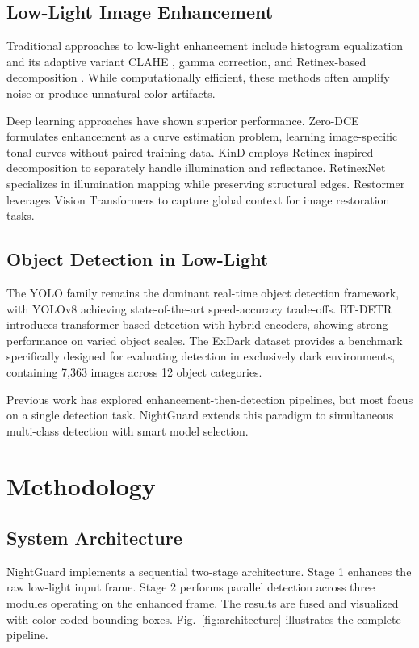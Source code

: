 \documentclass[conference]{IEEEtran}
\begin{document}
\subsection{Low-Light Image Enhancement}

Traditional approaches to low-light enhancement include histogram equalization and its adaptive variant CLAHE \cite{b6}, gamma correction, and Retinex-based decomposition \cite{b7}. While computationally efficient, these methods often amplify noise or produce unnatural color artifacts.

Deep learning approaches have shown superior performance. Zero-DCE \cite{b8} formulates enhancement as a curve estimation problem, learning image-specific tonal curves without paired training data. KinD \cite{b9} employs Retinex-inspired decomposition to separately handle illumination and reflectance. RetinexNet \cite{b10} specializes in illumination mapping while preserving structural edges. Restormer \cite{b11} leverages Vision Transformers to capture global context for image restoration tasks.

\subsection{Object Detection in Low-Light}

The YOLO family \cite{b2} remains the dominant real-time object detection framework, with YOLOv8 achieving state-of-the-art speed-accuracy trade-offs. RT-DETR \cite{b3} introduces transformer-based detection with hybrid encoders, showing strong performance on varied object scales. The ExDark dataset \cite{b5} provides a benchmark specifically designed for evaluating detection in exclusively dark environments, containing 7,363 images across 12 object categories.

Previous work has explored enhancement-then-detection pipelines, but most focus on a single detection task. NightGuard extends this paradigm to simultaneous multi-class detection with smart model selection.

\section{Methodology}

\subsection{System Architecture}

NightGuard implements a sequential two-stage architecture. Stage 1 enhances the raw low-light input frame. Stage 2 performs parallel detection across three modules operating on the enhanced frame. The results are fused and visualized with color-coded bounding boxes. Fig.~\ref{fig:architecture} illustrates the complete pipeline.
\end{document}
